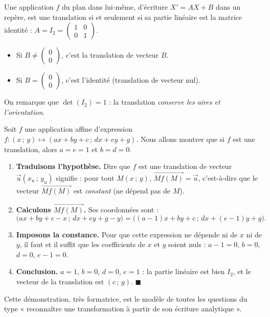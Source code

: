 \documentclass[11pt]{article}
\newcommand{\cle}[1]{{\popxbold\color{popdark}#1}}
\begin{document}
\begin{propriete}
Une application $f$ du plan dans lui-même, d'écriture $X' = AX + B$ dans un repère, est une \cle{translation} si et seulement si sa partie linéaire est la matrice identité : $A = I_2 = \begin{pmatrix} 1 & 0 \\ 0 & 1 \end{pmatrix}$.
\begin{itemize}
\item Si $B \neq \begin{pmatrix} 0 \\ 0 \end{pmatrix}$, c'est la translation de vecteur $B$.
\item Si $B = \begin{pmatrix} 0 \\ 0 \end{pmatrix}$, c'est l'identité (translation de vecteur nul).
\end{itemize}
On remarque que $\det(I_2) = 1$ : la translation \emph{conserve les aires et l'orientation}.
\end{propriete}

\begin{experience}
Soit $f$ une application affine d'expression $f : (x\,;\,y) \mapsto (ax + by + c\,;\,dx + ey + g)$. Nous allons montrer que si $f$ est une translation, alors $a = e = 1$ et $b = d = 0$.
\begin{enumerate}
\item \textbf{Traduisons l'hypothèse.} Dire que $f$ est une translation de vecteur $\vec{u}(x_u\,;\,y_u)$ signifie : pour tout $M(x\,;\,y)$, $\overrightarrow{Mf(M)} = \vec{u}$, c'est-à-dire que le vecteur $\overrightarrow{Mf(M)}$ est \emph{constant} (ne dépend pas de $M$).
\item \textbf{Calculons $\overrightarrow{Mf(M)}$.} Ses coordonnées sont :
\[ \big( ax + by + c - x \,;\, dx + ey + g - y \big) = \big( (a-1)x + by + c \,;\, dx + (e-1)y + g \big). \]
\item \textbf{Imposons la constance.} Pour que cette expression ne dépende ni de $x$ ni de $y$, il faut et il suffit que les coefficients de $x$ et $y$ soient nuls : $a - 1 = 0$, $b = 0$, $d = 0$, $e - 1 = 0$.
\item \textbf{Conclusion.} $a = 1$, $b = 0$, $d = 0$, $e = 1$ : la partie linéaire est bien $I_2$, et le vecteur de la translation est $(c\,;\,g)$. $\blacksquare$
\end{enumerate}
Cette démonstration, très formatrice, est le modèle de toutes les questions du type « reconnaître une transformation à partir de son écriture analytique ».
\end{experience}
\end{document}
